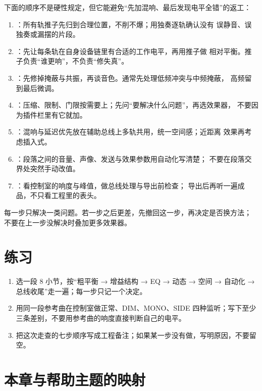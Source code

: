 下面的顺序不是硬性规定，但它能避免“先加混响、最后发现电平全错”的返工：

\begin{enumerate}
  \item {}：所有轨推子先归到合理位置，不削不爆；用独奏逐轨确认没有
        误静音、误独奏或漏摆的片段。
  \item {}：先让每条轨在自身设备链里有合适的工作电平，再用推子做
        相对平衡。推子负责“谁更响”，不负责“修失真”。
  \item {}：先修掉掩蔽与共振，再谈音色。通常先处理低频冲突与中频掩蔽，
        高频留到最后微调。
  \item {}：压缩、限制、门限按需要上；先问“要解决什么问题”，再选效果器，
        不要因为插件栏里有它就加。
  \item {}：混响与延迟优先放在辅助总线上多轨共用，统一空间感；近距离
        效果再考虑插入式。
  \item {}：段落之间的音量、声像、发送与效果参数用自动化写清楚；
        不要在段落交界处突然手动改值。
  \item {}：看控制室的响度与峰值，做总线处理与导出前检查；
        导出后再听一遍成品，不只看工程里的表头。
\end{enumerate}

每一步只解决一类问题。若一步之后更差，先撤回这一步，再决定是否换方法；
不要在上一步没解决时叠加更多效果器。

\section{练习}


\begin{exercise}
\begin{enumerate}
  \item 选一段 8 小节，按“粗平衡 → 增益结构 → EQ → 动态 → 空间 → 自动化 → 总线收尾”走一遍；每一步只记一个决定。
  \item 用同一段参考曲在控制室做正常、DIM、MONO、SIDE 四种监听；写下至少三条差别，不要用参考曲的响度直接判断自己的电平。
  \item 把这次走查的七步顺序写成工程备注；如果某一步没有做，写明原因，不要留空。
\end{enumerate}
\end{exercise}

\section{本章与帮助主题的映射}

